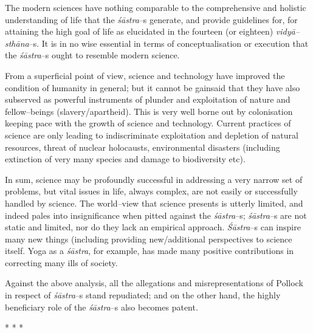 The modern sciences have nothing comparable to the comprehensive and holistic understanding of life that the \textit{śāstra}–s generate, and provide guidelines for, for attaining the high goal of life as elucidated in the fourteen (or eighteen) \textit{vidyā–sthāna}–s. It is in no wise essential in terms of conceptualisation or execution that the \textit{śāstra}–s ought to resemble modern science.

From a superficial point of view, science and technology have improved the condition of humanity in general; but it cannot be gainsaid that they have also subserved as powerful instruments of plunder and exploitation of nature and fellow–beings (slavery/apartheid). This is very well borne out by colonisation keeping pace with the growth of science and technology. Current practices of science are only leading to indiscriminate exploitation and depletion of natural resources, threat of nuclear holocausts, environmental disasters (including extinction of very many species and damage to biodiversity etc).

In sum, science may be profoundly successful in addressing a very narrow set of problems, but vital issues in life, always complex, are not easily or successfully handled by science. The world–view that science presents is utterly limited, and indeed pales into insignificance when pitted against the \textit{śāstra}–s; \textit{śāstra}–s are not static and limited, nor do they lack an empirical approach. \textit{Śāstra}–s can inspire many new things (including providing new/additional perspectives to science itself. Yoga as a \textit{śāstra}, for example, has made many positive contributions in correcting many ills of society.

Against the above analysis, all the allegations and misrepresentations of Pollock in respect of \textit{śāstra}–s stand repudiated; and on the other hand, the highly beneficiary role of the \textit{śāstra}–s also becomes patent.

\begin{center}
* * *
\end{center}

\vskip -7pt

